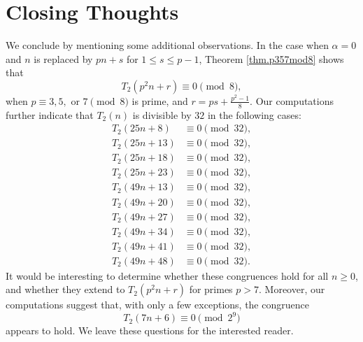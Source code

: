 \documentclass{amsart}
\theoremstyle{definition}
\begin{document}
\section{Closing Thoughts}\label{sec:closingthoughts}


We conclude by mentioning some additional observations. 
In the case when $\alpha = 0$ and $n$ is replaced by $pn+s$ for $1\leq s \leq p-1$, Theorem \ref{thm.p357mod8} shows that
\[
T_2(p^2n+r)\equiv 0\pmod{8},
\]
when
$p\equiv 3, 5, \text{ or } 7\pmod{8}$ is prime, and $r=\displaystyle{ps+\frac{p^2-1}{8}}$. 
Our computations further indicate that $T_2(n)$ is divisible by $32$ in the following cases:
\[
\begin{aligned}
	T_2(25n+8)&\equiv 0 \pmod{32},\\[1mm]
	T_2(25n+13)&\equiv 0 \pmod{32},\\[1mm]
	T_2(25n+18)&\equiv 0 \pmod{32},\\[1mm]
	T_2(25n+23)&\equiv 0 \pmod{32},\\[1mm]
	T_2(49n+13)&\equiv 0 \pmod{32},\\[1mm]
	T_2(49n+20)&\equiv 0 \pmod{32},\\[1mm]
	T_2(49n+27)&\equiv 0 \pmod{32},\\[1mm]
	T_2(49n+34)&\equiv 0 \pmod{32},\\[1mm]
	T_2(49n+41)&\equiv 0 \pmod{32},\\[1mm]
	T_2(49n+48)&\equiv 0 \pmod{32}.
\end{aligned}
\]
It would be interesting to determine whether these congruences hold for all $n\geq 0$, and whether they extend to $T_2(p^2n+r)$ for primes $p>7$. Moreover, our computations suggest that, with only a few exceptions, the congruence
\[
T_2(7n+6)\equiv 0\pmod{2^9}
\]
appears to hold. We leave these questions for the interested reader.





\nocite{*}




%
\end{document}
